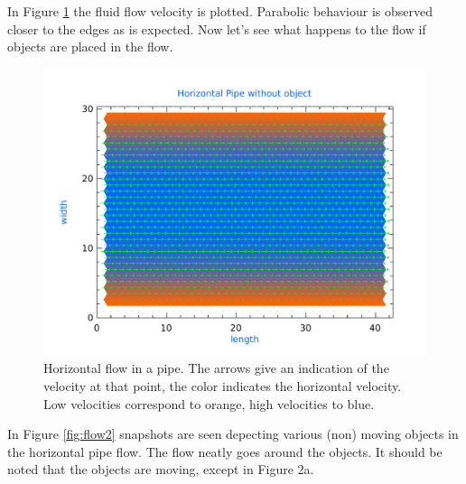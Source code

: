 In Figure \ref{fig:flow1} the fluid flow velocity is plotted. Parabolic behaviour is observed closer to the edges as is expected. Now let's see what happens to the flow if objects are placed in the flow.

\begin{figure}[ht!]
\centering
\includegraphics[width=.7\textwidth]{plots/flow.pdf}
\caption{Horizontal flow in a pipe. The arrows give an indication of the velocity at that point, the color indicates the horizontal velocity. Low velocities correspond to orange, high velocities to blue. }
\label{fig:flow1}
\end{figure}



In Figure \ref{fig:flow2} snapshots are seen depecting various (non) moving objects in the horizontal pipe flow. The flow neatly goes around the objects. It should be noted that the objects are moving, except in Figure 2a.

